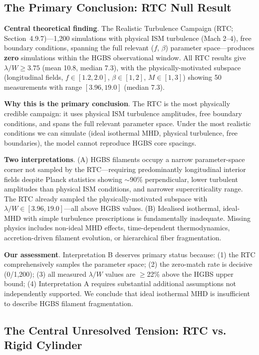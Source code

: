\documentclass[twocolumn]{mnras}
\begin{document}
\subsection{The Primary Conclusion: RTC Null Result}

\textbf{Central theoretical finding}. The Realistic Turbulence Campaign (RTC; Section~4.9.7)---1,200 simulations with physical ISM turbulence (Mach 2--4), free boundary conditions, spanning the full relevant ($f$, $\beta$) parameter space---produces \textbf{zero} simulations within the HGBS observational window. All RTC results give $\lambda/W \geq 3.75$ (mean 10.8, median 7.3), with the physically-motivated subspace (longitudinal fields, $f \in [1.2, 2.0]$, $\beta \in [1, 2]$, $M \in [1, 3]$) showing 50 measurements with range $[3.96, 19.0]$ (median 7.3).

\textbf{Why this is the primary conclusion}. The RTC is the most physically credible campaign: it uses physical ISM turbulence amplitudes, free boundary conditions, and spans the full relevant parameter space. Under the most realistic conditions we can simulate (ideal isothermal MHD, physical turbulence, free boundaries), the model cannot reproduce HGBS core spacings.

\textbf{Two interpretations}. (A) HGBS filaments occupy a narrow parameter-space corner not sampled by the RTC---requiring predominantly longitudinal interior fields despite Planck statistics showing $\sim$90\% perpendicular, lower turbulent amplitudes than physical ISM conditions, and narrower supercriticality range. The RTC already sampled the physically-motivated subspace with $\lambda/W \in [3.96, 19.0]$---all above HGBS values. (B) Idealised isothermal, ideal-MHD with simple turbulence prescriptions is fundamentally inadequate. Missing physics includes non-ideal MHD effects, time-dependent thermodynamics, accretion-driven filament evolution, or hierarchical fiber fragmentation.

\textbf{Our assessment}. Interpretation B deserves primary status because: (1) the RTC comprehensively samples the parameter space; (2) the zero-match rate is decisive (0/1,200); (3) all measured $\lambda/W$ values are $\geq$22\% above the HGBS upper bound; (4) Interpretation A requires substantial additional assumptions not independently supported. We conclude that ideal isothermal MHD is insufficient to describe HGBS filament fragmentation.

\subsection{The Central Unresolved Tension: RTC vs. Rigid Cylinder}
\end{document}
